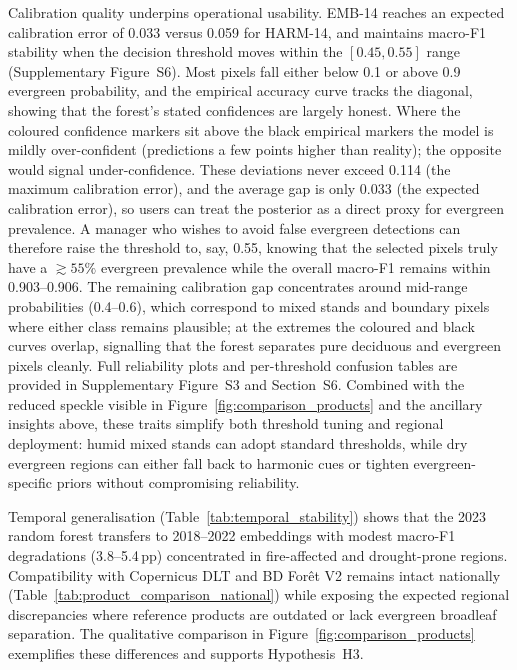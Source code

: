 \documentclass[utf8]{FrontiersinHarvard}
\begin{document}
Calibration quality underpins operational usability. EMB-14 reaches an expected calibration error of 0.033 versus 0.059 for HARM-14, and maintains macro-F1 stability when the decision threshold moves within the \([0.45,0.55]\) range (Supplementary Figure~S6). Most pixels fall either below 0.1 or above 0.9 evergreen probability, and the empirical accuracy curve tracks the diagonal, showing that the forest's stated confidences are largely honest. Where the coloured confidence markers sit above the black empirical markers the model is mildly over-confident (predictions a few points higher than reality); the opposite would signal under-confidence. These deviations never exceed 0.114 (the maximum calibration error), and the average gap is only 0.033 (the expected calibration error), so users can treat the posterior as a direct proxy for evergreen prevalence. A manager who wishes to avoid false evergreen detections can therefore raise the threshold to, say, 0.55, knowing that the selected pixels truly have a \(\gtrsim 55\%\) evergreen prevalence while the overall macro-F1 remains within 0.903–0.906. The remaining calibration gap concentrates around mid-range probabilities (0.4--0.6), which correspond to mixed stands and boundary pixels where either class remains plausible; at the extremes the coloured and black curves overlap, signalling that the forest separates pure deciduous and evergreen pixels cleanly. Full reliability plots and per-threshold confusion tables are provided in Supplementary Figure~S3 and Section~S6. Combined with the reduced speckle visible in Figure~\ref{fig:comparison_products} and the ancillary insights above, these traits simplify both threshold tuning and regional deployment: humid mixed stands can adopt standard thresholds, while dry evergreen regions can either fall back to harmonic cues or tighten evergreen-specific priors without compromising reliability.

Temporal generalisation (Table~\ref{tab:temporal_stability}) shows that the 2023 random forest transfers to 2018--2022 embeddings with modest macro-F1 degradations (3.8--5.4\,pp) concentrated in fire-affected and drought-prone regions. Compatibility with Copernicus DLT and BD Forêt V2 remains intact nationally (Table~\ref{tab:product_comparison_national}) while exposing the expected regional discrepancies where reference products are outdated or lack evergreen broadleaf separation. The qualitative comparison in Figure~\ref{fig:comparison_products} exemplifies these differences and supports Hypothesis~H3.
\end{document}
